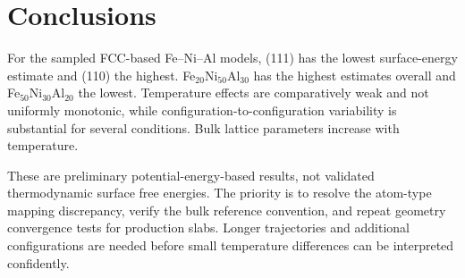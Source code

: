 \section{Conclusions}
For the sampled FCC-based Fe--Ni--Al models, (111) has the lowest surface-energy estimate and (110) the highest. Fe$_{20}$Ni$_{50}$Al$_{30}$ has the highest estimates overall and Fe$_{50}$Ni$_{30}$Al$_{20}$ the lowest. Temperature effects are comparatively weak and not uniformly monotonic, while configuration-to-configuration variability is substantial for several conditions. Bulk lattice parameters increase with temperature.

These are preliminary potential-energy-based results, not validated thermodynamic surface free energies. The priority is to resolve the atom-type mapping discrepancy, verify the bulk reference convention, and repeat geometry convergence tests for production slabs. Longer trajectories and additional configurations are needed before small temperature differences can be interpreted confidently.
